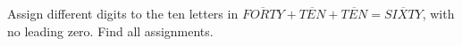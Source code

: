 Assign different digits to the ten letters in $\overline{FORTY}+\overline{TEN}+\overline{TEN}=\overline{SIXTY}$, with no leading zero. Find all assignments.
